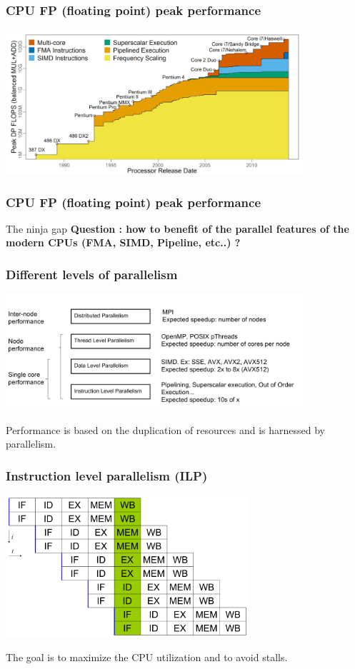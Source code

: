 \begin{frame}[containsverbatim]
\frametitle{CPU FP (floating point) peak performance}
\begin{center}
\includegraphics[width=11cm]{DayGilles/images/fp-peak.jpg}
\end{center}
\end{frame}


\begin{frame}[containsverbatim]
\frametitle{CPU FP (floating point) peak performance}
\begin{center}
\begin{alertblock}{The ninja gap}
\textbf{Question : how to benefit of the parallel features of the modern CPUs (FMA, SIMD, Pipeline, etc..) ?}
\end{alertblock}
\end{center}
\end{frame}


\begin{frame}[containsverbatim]
\frametitle{Different levels of parallelism}
\begin{center}
\includegraphics[width=11cm]{DayGilles/images/parallelism.jpg}
\end{center}
\vfill
Performance is based on the duplication of resources and is harnessed by parallelism.
\end{frame}


\begin{frame}[containsverbatim]
\frametitle{Instruction level parallelism (ILP)}
\begin{center}
\includegraphics[width=9cm]{DayGilles/images/ilp.png}
\end{center}
\vfill
The goal is to maximize the CPU utilization and to avoid stalls. 
\end{frame}



